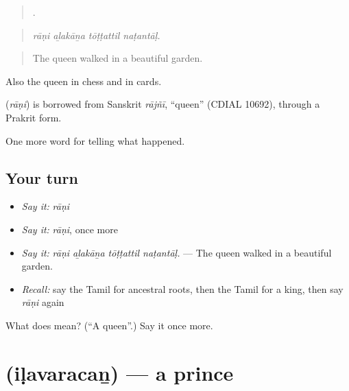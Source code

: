 \begin{quote}
   .
\end{quote}

\begin{quote}
\emph{rāṇi aḻakāṉa tōṭṭattil naṭantāḷ.}
\end{quote}

\begin{quote}
The queen walked in a beautiful garden.
\end{quote}

Also the queen in chess and in cards.

\begin{cousinweb}
\textbf{} (\emph{rāṇi}) is borrowed from Sanskrit \emph{rājñī}, \textquotedblleft{}queen\textquotedblright{} (CDIAL 10692), through a Prakrit form.
\end{cousinweb}

\begin{grammarlens}[title={What you've built}]
One more word for telling what happened.
\end{grammarlens}

\subsection*{Your turn}
\begin{itemize}
\raggedright
  \item \emph{Say it:} \emph{rāṇi}
  \item \emph{Say it:} \emph{rāṇi}, once more
  \item \emph{Say it:} \emph{rāṇi aḻakāṉa tōṭṭattil naṭantāḷ.} — The queen walked in a beautiful garden.
  \item \emph{Recall:} say the Tamil for ancestral roots, then the Tamil for a king, then say \emph{rāṇi} again
\end{itemize}

\begin{tcolorbox}[breakable,colback=teal!4,colframe=teal!35!black,title={Before you move on}]
What does  mean? (\textquotedblleft{}A queen\textquotedblright{}.) Say it once more.
\end{tcolorbox}
\section[\texorpdfstring{\ta{இளவரசன்} (iḷavaracaṉ)}{இளவரசன் (iḷavaracaṉ)}]{ (iḷavaracaṉ) — a prince}

\label{lesson:TA-C328-ilavaracan}




